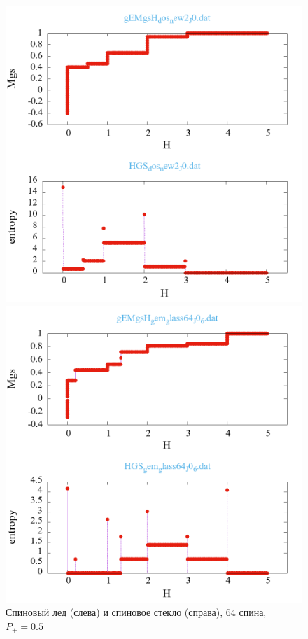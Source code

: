 \documentclass[utf8, babel, sor, jor, amsmath, amssymb, reprint]{elsarticle} %
\begin{document}
\begin{figure}[H]
	\begin{minipage}[h]{0.45\linewidth}
		\includegraphics[width=1\linewidth]{pictures/_multiplot_SI64_J0.png}
	\end{minipage}
	\hfill
	\begin{minipage}[h]{0.45\linewidth}
		\includegraphics[width=1\linewidth]{pictures/_multiplot_SG64_J0.png}
	\end{minipage}
	\caption{Спиновый лед (слева) и спиновое стекло (справа), 64 спина, $P_+ = 0.5$}
	\label{fig:_multiplot_SI_SG_64}
\end{figure}
\end{document}
